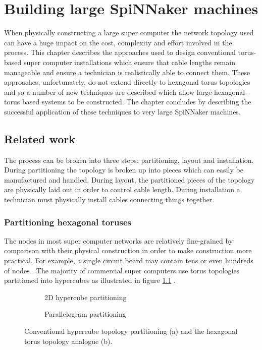 \chapter{Building large SpiNNaker machines}
	
	When physically constructing a large super computer the network topology used
	can have a huge impact on the cost, complexity and effort involved in the
	process. This chapter describes the approaches used to design conventional
	torus-based super computer installations which ensure that cable lengths
	remain manageable and ensure a technician is realistically able to connect
	them. These approaches, unfortunately, do not extend directly to hexagonal
	torus topologies and so a number of new techniques are described which allow
	large hexagonal-torus based systems to be constructed. The chapter concludes
	by describing the successful application of these techniques to very large
	SpiNNaker machines.
	
	\section{Related work}
		
		The process can be broken into three steps: partitioning, layout and
		installation. During partitioning the topology is broken up into pieces
		which can easily be manufactured and handled. During layout, the
		partitioned pieces of the topology are physically laid out in order to
		control cable length. During installation a technician must physically
		install cables connecting things together.
		
		\subsection{Partitioning hexagonal toruses}
			
			The nodes in most super computer networks are relatively fine-grained by
			comparison with their physical construction in order to make construction
			more practical. For example, a single circuit board may contain tens or
			even hundreds of nodes \cite{gilge14,ajima12}. The majority of commercial
			super computers use torus topologies partitioned into hypercubes as
			illustrated in figure \ref{fig:hypercube-partitioning}
			\cite{chen11,ajima12}.
			
			\begin{figure}
				\center
				\begin{subfigure}[b]{0.45\textwidth}
					\center
					\caption{2D hypercube partitioning}
					\label{fig:hypercube-partitioning}
				\end{subfigure}
				\begin{subfigure}[b]{0.45\textwidth}
					\center
					\caption{Parallelogram partitioning}
					\label{fig:parallelogram-partitioning}
				\end{subfigure}
				
				\caption{Conventional hypercube topology partitioning (a) and the
				hexagonal torus topology analogue (b).}
				\label{fig:partitioning-options}
			\end{figure}
			

